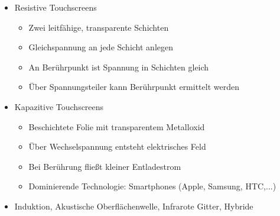 \begin{itemize}
\item Resistive Touchscreens
\begin{itemize}
\item Zwei leitfähige, transparente Schichten
\item Gleichspannung an jede Schicht anlegen
\item An Berührpunkt ist Spannung in Schichten gleich
\item Über Spannungsteiler kann Berührpunkt ermittelt werden
\end{itemize}
\item Kapazitive Touchscreens
\begin{itemize}
\item Beschichtete Folie mit transparentem Metalloxid
\item Über Wechselspannung entsteht elektrisches Feld
\item Bei Berührung fließt kleiner Entladestrom
\item Dominierende Technologie: Smartphones (Apple, Samsung, HTC,...)
\end{itemize}
\item Induktion, Akustische Oberflächenwelle, Infrarote Gitter, Hybride
\end{itemize}
